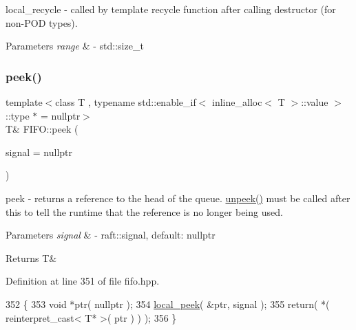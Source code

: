 local\+\_\+recycle -\/ called by template recycle function after calling destructor (for non-\/\+P\+OD types). 
\begin{DoxyParams}{Parameters}
{\em range} & -\/ std\+::size\+\_\+t \\
\hline
\end{DoxyParams}
\hypertarget{class_f_i_f_o_a8721e94d35fdfb20294ae8478d0baae5}{}\label{class_f_i_f_o_a8721e94d35fdfb20294ae8478d0baae5} 
\subsubsection{\texorpdfstring{peek()}{peek()}}
{\footnotesize\ttfamily template$<$class T , typename std\+::enable\+\_\+if$<$ inline\+\_\+alloc$<$ T $>$\+::value $>$\+::type $\ast$  = nullptr$>$ \\
T\& F\+I\+F\+O\+::peek (\begin{DoxyParamCaption}\item[{raft\+::signal $\ast$}]{signal = {\ttfamily nullptr} }\end{DoxyParamCaption})\hspace{0.3cm}{\ttfamily [inline]}}

peek -\/ returns a reference to the head of the queue. \hyperlink{class_f_i_f_o_aa0cbb6c4a5b8783af38c6deb1a6f651e}{unpeek()} must be called after this to tell the runtime that the reference is no longer being used. 
\begin{DoxyParams}{Parameters}
{\em signal} & -\/ raft\+::signal, default\+: nullptr \\
\hline
\end{DoxyParams}
\begin{DoxyReturn}{Returns}
T\& 
\end{DoxyReturn}


Definition at line 351 of file fifo.\+hpp.


\begin{DoxyCode}
352    \{
353       \textcolor{keywordtype}{void} *ptr( \textcolor{keyword}{nullptr} );
354       \hyperlink{class_f_i_f_o_afc960790e2803da85fa24e64c61c38b5}{local\_peek}( &ptr, signal );
355       \textcolor{keywordflow}{return}( *( reinterpret\_cast< T* >( ptr ) ) );
356    \}
\end{DoxyCode}
\hypertarget{class_f_i_f_o_ada716e83c59345f73295d3b6f720681f}{}\label{class_f_i_f_o_ada716e83c59345f73295d3b6f720681f} 

